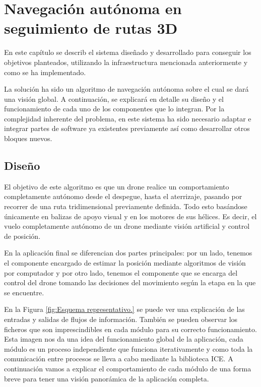 \chapter{Navegación autónoma en seguimiento de rutas 3D}\label{cap.desarrollo}
\hspace{1cm} En este capítulo se describ el sistema diseñado y desarrollado para conseguir los objetivos planteados, utilizando la infraestructura mencionada anteriormente y como se ha implementado.

\hspace{1cm} La solución ha sido un algoritmo de navegación autónoma sobre el cual se dará una visión global. A continuación, se explicará en detalle su diseño y el funcionamiento de cada uno de los componentes que lo integran. Por la complejidad inherente del problema, en este sistema ha sido necesario adaptar e integrar partes de software ya existentes previamente así como desarrollar otros bloques nuevos.


\section{Diseño}
\hspace{1cm} El objetivo de este algoritmo es que un drone realice un comportamiento completamente autónomo desde el despegue, hasta el aterrizaje, pasando por recorrer de una ruta tridimensional previamente definida. Todo esto basándose únicamente en balizas de apoyo visual y en los motores de sus hélices. Es decir, el vuelo completamente autónomo de un drone mediante visión artificial y control de posición.

\hspace{1cm} En la aplicación final se diferencian dos partes principales: por un lado, tenemos el componente encargado de estimar la posición mediante algoritmos de visión por computador y por otro lado, tenemos el componente que se encarga del control del drone tomando las decisiones del movimiento según la etapa en la que se encuentre.

\hspace{1cm} En la Figura \ref{fig:Esquema representativo.} se puede ver una explicación de las entradas y salidas de flujos de información. También se pueden observar los ficheros que son imprescindibles en cada módulo para su correcto funcionamiento. Esta imagen nos da una idea del funcionamiento global de la aplicación, cada módulo es un proceso independiente que funciona iterativamente y como toda la comunicación entre procesos se lleva a cabo mediante la biblioteca ICE. A continuación vamos a explicar el comportamiento de cada módulo de una forma breve para tener una visión panorámica de la aplicación completa.

